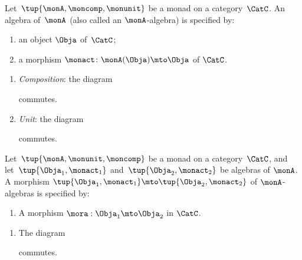 \begin{ctdefinition}
	\label{def:algebramon}
	Let~$\tup{\monA, \moncomp, \monunit}$ be a monad on a category~$\CatC$.
	An algebra of~$\monA$ (also called an $\monA$-algebra) is specified by: \

	\constit
	\begin{enumerate}
		\item an object $\Obja$ of~$\CatC$;
		\item a morphism $\monact\colon \monA(\Obja) \mto \Obja$ of $\CatC$.
	\end{enumerate}
	\condit
	\begin{enumerate}
		\item \emph{Composition}: the diagram
		      \begin{center}
		      \end{center}
		      commutes.
		\item \emph{Unit}: the diagram
		      \begin{center}
		      \end{center}
		      commutes.
	\end{enumerate}
\end{ctdefinition}



\begin{ctdefinition}
	\label{def:algebramorphism}
	Let~$\tup{\monA, \monunit, \moncomp}$ be a monad on a category~$\CatC$, and let~$\tup{\Obja_1, \monact_1}$ and~$\tup{\Obja_2, \monact_2}$ be algebras of $\monA$.
	A morphism $\tup{\Obja_1, \monact_1} \mto \tup{\Obja_2, \monact_2}$ of $\monA$-algebras is specified by: \

	\constit
	\begin{enumerate}
		\item A morphism $\mora : \Obja_1 \mto \Obja_2$ in $\CatC$.
	\end{enumerate}
	\condit
	\begin{enumerate}
		\item The diagram
		      \begin{center}
		      \end{center}
		      commutes.
	\end{enumerate}
\end{ctdefinition}

